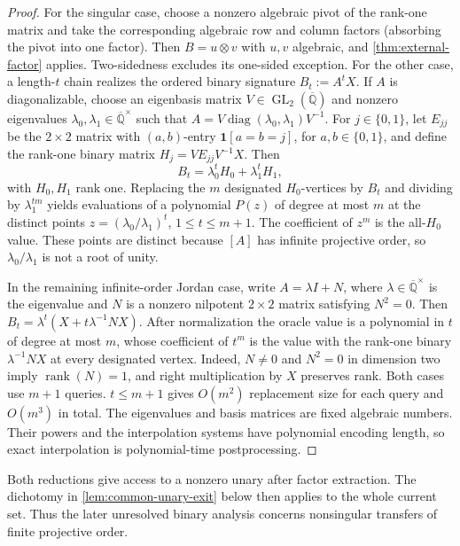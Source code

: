 \documentclass[11pt,letterpaper,onecolumn]{article}
\theoremstyle{plain}
\theoremstyle{definition}
\theoremstyle{remark}
\newcommand{\AlgNums}{\overline{\mathbb Q}}
\newcommand{\GL}{\operatorname{GL}}
\newcommand{\diag}{\operatorname{diag}}
\newcommand{\rank}{\operatorname{rank}}
\newcommand{\one}{\mathbf 1}
\begin{document}
\begin{proof}
For the singular case, choose a nonzero algebraic pivot of the rank-one matrix
and take the corresponding algebraic row and column factors (absorbing the
pivot into one factor). Then \(B=u\otimes v\) with \(u,v\) algebraic, and
\cref{thm:external-factor} applies.  Two-sidedness excludes its one-sided
exception.  For the other case, a length-\(t\) chain realizes the ordered
binary signature \(B_t:=A^tX\).  If \(A\) is diagonalizable, choose an eigenbasis matrix
\(V\in\GL_2(\AlgNums)\) and nonzero eigenvalues
\(\lambda_0,\lambda_1\in\AlgNums^\times\) such that
\(A=V\diag(\lambda_0,\lambda_1)V^{-1}\).  For \(j\in\{0,1\}\), let
\(E_{jj}\) be the \(2\times2\) matrix with \((a,b)\)-entry
\(\one[a=b=j]\), for \(a,b\in\{0,1\}\), and define the rank-one binary
matrix \(H_j=VE_{jj}V^{-1}X\).  Then
\[
 B_t=\lambda_0^tH_0+\lambda_1^tH_1,
\]
with \(H_0,H_1\) rank one.  Replacing the \(m\) designated \(H_0\)-vertices by \(B_t\) and
dividing by \(\lambda_1^{tm}\) yields evaluations of a polynomial \(P(z)\)
of degree at most \(m\) at the distinct points
\(z=(\lambda_0/\lambda_1)^t\), \(1\le t\le m+1\). The coefficient of
\(z^m\) is the all-\(H_0\) value.  These points are distinct because
\([A]\) has infinite projective order, so \(\lambda_0/\lambda_1\) is not a
root of unity.

In the remaining infinite-order Jordan case, write \(A=\lambda I+N\), where
\(\lambda\in\AlgNums^\times\) is the eigenvalue and \(N\) is a nonzero
nilpotent \(2\times2\) matrix satisfying \(N^2=0\).  Then
\(B_t=\lambda^t(X+t\lambda^{-1}NX)\).  After normalization the oracle value
is a polynomial in \(t\) of degree at most \(m\), whose coefficient of
\(t^m\) is the value with the rank-one binary \(\lambda^{-1}NX\) at every
designated vertex.
Indeed, \(N\ne0\) and \(N^2=0\) in dimension two imply
\(\rank(N)=1\), and right multiplication by \(X\) preserves
rank.
Both cases use \(m+1\) queries. \(t\le m+1\) gives \(O(m^2)\) replacement
size for each query and \(O(m^3)\) in total.  The eigenvalues and basis
matrices are fixed algebraic numbers.  Their powers and the interpolation
systems have polynomial encoding length, so exact interpolation is
polynomial-time postprocessing.
\end{proof}

Both reductions give access to a nonzero unary after factor extraction.
The dichotomy in \cref{lem:common-unary-exit} below then applies to the
whole current set. Thus the later unresolved binary analysis concerns
nonsingular transfers of finite projective order.
\end{document}

